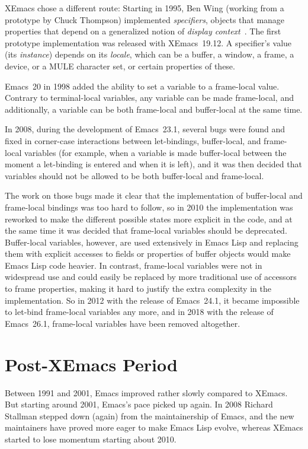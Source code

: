 \documentclass[format=acmsmall,screen]{acmart}
\newcommand \Elisp {Emacs Lisp}
\begin{document}
XEmacs chose a different route: Starting in 1995, Ben Wing (working
from a prototype by Chuck Thompson) implemented
\emph{specifiers}, objects that manage properties that
depend on a generalized notion of \emph{display
  context}~\cite{XEmacsLispRef1998}.  The first prototype
implementation was released with XEmacs~19.12.
A specifier's value (its \emph{instance}) depends on its
\emph{locale}, which can be a buffer, a window, a frame, a device, or a MULE
character set, or certain properties of these.

Emacs~20 in 1998 added the ability to set a variable to a frame-local
value.  Contrary to terminal-local variables, any variable can be made
frame-local, and additionally, a variable can be both frame-local and
buffer-local at the same time.

In 2008, during the development of Emacs~23.1, several bugs were found and
fixed in corner-case interactions between let-bindings, buffer-local, and
frame-local variables (for example, when a variable is made buffer-local
between the moment a let-binding is entered and when it is left), and
it was then decided that variables should not be allowed to be both
buffer-local and frame-local.

The work on those bugs made it clear that the implementation of buffer-local
and frame-local bindings was too hard to follow, so in 2010 the
implementation was reworked to make the different possible states more
explicit in the code, and at the same time it was decided that frame-local
variables should be deprecated.  Buffer-local variables, however, are used
extensively in \Elisp{} and replacing them with explicit accesses to fields
or properties of buffer objects would make \Elisp{} code heavier.
In contrast, frame-local variables were not in widespread use and could easily be
replaced by more traditional use of accessors to frame properties, making it
hard to justify the extra complexity in the implementation.  So in 2012 with
the release of Emacs~24.1, it became impossible to let-bind frame-local
variables any more, and in 2018 with the release of Emacs~26.1, frame-local
variables have been removed altogether.

\section{Post-XEmacs Period}           %
\label{sec:post-xemacs}

Between 1991 and 2001, Emacs improved rather slowly compared to XEmacs.
But starting around 2001, Emacs's pace picked up again.  In 2008 Richard
Stallman stepped down (again) from the maintainership of Emacs, and the new
maintainers have proved more eager to make \Elisp{} evolve, whereas XEmacs
started to lose momentum starting about 2010.
\end{document}
